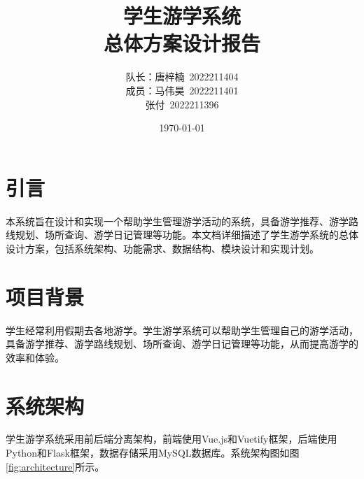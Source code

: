 \documentclass{ctexart}
\title{学生游学系统 \\ 总体方案设计报告}
\author{队长：唐梓楠\ 2022211404 \\ 成员：马伟昊\ 2022211401 \\ 张付\ 2022211396}
\date{\today}
\begin{document}
\maketitle

\tableofcontents

\newpage

\section{引言}
本系统旨在设计和实现一个帮助学生管理游学活动的系统，具备游学推荐、游学路线规划、场所查询、游学日记管理等功能。本文档详细描述了学生游学系统的总体设计方案，包括系统架构、功能需求、数据结构、模块设计和实现计划。

\section{项目背景}
学生经常利用假期去各地游学。学生游学系统可以帮助学生管理自己的游学活动，具备游学推荐、游学路线规划、场所查询、游学日记管理等功能，从而提高游学的效率和体验。

\section{系统架构}
学生游学系统采用前后端分离架构，前端使用Vue.js和Vuetify框架，后端使用Python和Flask框架，数据存储采用MySQL数据库。系统架构图如图\ref{fig:architecture}所示。
\end{document}
